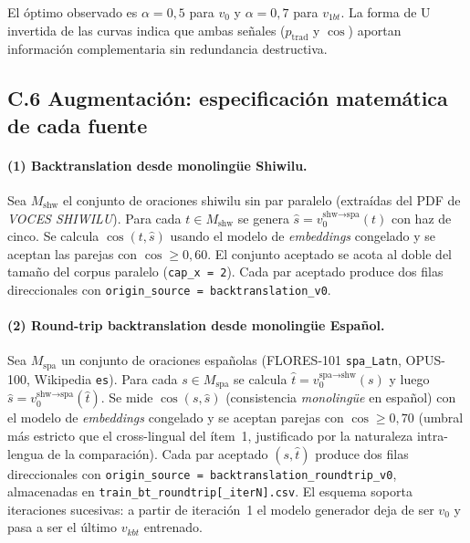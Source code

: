 \documentclass[12pt,a4paper,oneside]{book}
\newcommand{\filepath}[1]{\nolinkurl{#1}}
\begin{document}
\begin{table}[h]
\centering
\caption{Ablación de \(\alpha\) para el modelo aumentado \(v_{1bt}\) (variante \texttt{xl}).}
\label{tab:anexo-nmt-ablation-v1}

\end{table}

El óptimo observado es \(\alpha = 0{,}5\) para \(v_0\) y \(\alpha = 0{,}7\) para \(v_{1bt}\). La forma de U invertida de las curvas indica que ambas señales (\(p_{\text{trad}}\) y \(\cos\)) aportan información complementaria sin redundancia destructiva.

\subsection*{C.6 Augmentación: especificación matemática de cada fuente}\label{anexo-nmt-augmentacion}

\paragraph{(1) Backtranslation desde monolingüe Shiwilu.}
Sea \(M_{\text{shw}}\) el conjunto de oraciones shiwilu sin par paralelo (extraídas del PDF de \emph{VOCES SHIWILU}). Para cada \(t \in M_{\text{shw}}\) se genera \(\hat{s} = v_0^{\text{shw}\rightarrow\text{spa}}(t)\) con haz de cinco. Se calcula \(\cos(t, \hat{s})\) usando el modelo de \emph{embeddings} congelado y se aceptan las parejas con \(\cos \geq 0{,}60\). El conjunto aceptado se acota al doble del tamaño del corpus paralelo (\texttt{cap\_x = 2}). Cada par aceptado produce dos filas direccionales con \texttt{origin\_source = backtranslation\_v0}.

\paragraph{(2) Round-trip backtranslation desde monolingüe Español.}
Sea \(M_{\text{spa}}\) un conjunto de oraciones españolas (FLORES-101 \texttt{spa\_Latn}, OPUS-100, Wikipedia \texttt{es}). Para cada \(s \in M_{\text{spa}}\) se calcula \(\hat{t} = v_0^{\text{spa}\rightarrow\text{shw}}(s)\) y luego \(\hat{s} = v_0^{\text{shw}\rightarrow\text{spa}}(\hat{t})\). Se mide \(\cos(s, \hat{s})\) (consistencia \emph{monolingüe} en español) con el modelo de \emph{embeddings} congelado y se aceptan parejas con \(\cos \geq 0{,}70\) (umbral más estricto que el cross-lingual del ítem~1, justificado por la naturaleza intra-lengua de la comparación). Cada par aceptado \((s, \hat{t})\) produce dos filas direccionales con \texttt{origin\_source = backtranslation\_roundtrip\_v0}, almacenadas en \filepath{train\_bt\_roundtrip[\_iterN].csv}. El esquema soporta iteraciones sucesivas: a partir de iteración~1 el modelo generador deja de ser \(v_0\) y pasa a ser el último \(v_{kbt}\) entrenado.
\end{document}
